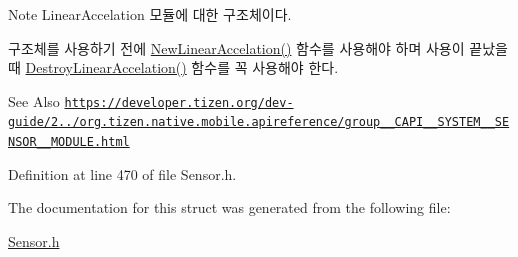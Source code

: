 \begin{DoxyNote}{Note}
Linear\-Accelation 모듈에 대한 구조체이다. \par
 구조체를 사용하기 전에 \hyperlink{Sensor_8h_aa7dc89111815a354e208a521a89936e9}{New\-Linear\-Accelation()} 함수를 사용해야 하며 사용이 끝났을 때 \hyperlink{Sensor_8h_a855b978e0631263963def31aa53c3545}{Destroy\-Linear\-Accelation()} 함수를 꼭 사용해야 한다. 
\end{DoxyNote}
\begin{DoxySeeAlso}{See Also}
\href{https://developer.tizen.org/dev-guide/2.3.0/org.tizen.native.mobile.apireference/group__CAPI__SYSTEM__SENSOR__MODULE.html}{\tt https\-://developer.\-tizen.\-org/dev-\/guide/2../org.\-tizen.\-native.\-mobile.\-apireference/group\-\_\-\-\_\-\-C\-A\-P\-I\-\_\-\-\_\-\-S\-Y\-S\-T\-E\-M\-\_\-\-\_\-\-S\-E\-N\-S\-O\-R\-\_\-\-\_\-\-M\-O\-D\-U\-L\-E.\-html} 
\end{DoxySeeAlso}


Definition at line 470 of file Sensor.\-h.



The documentation for this struct was generated from the following file\-:\begin{DoxyCompactItemize}
\item 
\hyperlink{Sensor_8h}{Sensor.\-h}\end{DoxyCompactItemize}
